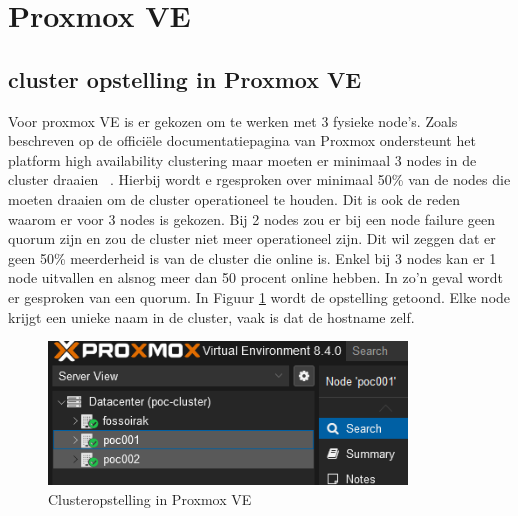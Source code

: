 


\section{Proxmox VE}%
\label{sec:ProxomoxVE}
\subsection{cluster opstelling in Proxmox VE}
Voor proxmox VE is er gekozen om te werken met 3 fysieke node's. Zoals beschreven op de officiële documentatiepagina van Proxmox ondersteunt het platform high availability clustering maar moeten er minimaal 3 nodes in de cluster draaien ~\autocite{proxmoxHA}.
Hierbij wordt e rgesproken over minimaal 50\% van de nodes die moeten draaien om de cluster operationeel te houden. Dit is ook de reden waarom er voor 3 nodes is gekozen.
Bij 2 nodes zou er bij een node failure geen quorum zijn en zou de cluster niet meer operationeel zijn. Dit wil zeggen dat er geen 50\% meerderheid is van de cluster die online is. Enkel bij 3 nodes kan er 1 node uitvallen en alsnog meer dan 50 procent online hebben. In zo’n geval wordt er gesproken van een quorum.
In Figuur \ref{fig:cluster-proxmox} wordt de opstelling getoond. Elke node krijgt een unieke naam in de cluster, vaak is dat de hostname zelf.
\begin{figure}[H]
  \centering
  \includegraphics[width=0.85\textwidth]{../poc/cluster-info-prox.png}
  \caption{Clusteropstelling in Proxmox VE}
  \label{fig:cluster-proxmox}
\end{figure}
